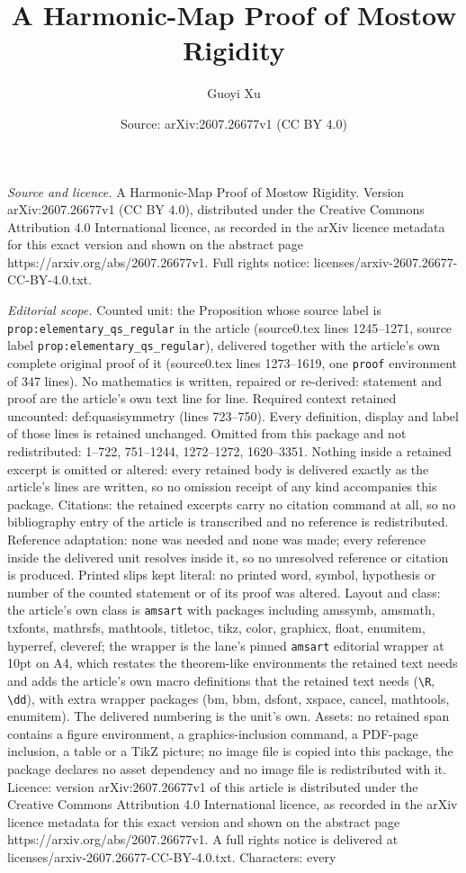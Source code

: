 \documentclass[10pt,a4paper]{amsart}
\title[A Harmonic-Map Proof of Mostow Rigidity]{A Harmonic-Map Proof of Mostow Rigidity}
\author{Guoyi Xu}
\date{Source: arXiv:2607.26677v1 (CC BY 4.0)}
\begin{document}
\maketitle

\noindent\emph{Source and licence.} A Harmonic-Map Proof of Mostow Rigidity. Version arXiv:2607.26677v1 (CC BY 4.0), distributed under the Creative Commons Attribution 4.0 International licence, as recorded in the arXiv licence metadata for this exact version and shown on the abstract page https://arxiv.org/abs/2607.26677v1. Full rights notice: licenses/arxiv-2607.26677-CC-BY-4.0.txt.\par\smallskip

\noindent\textit{Editorial scope.} Counted unit: the Proposition whose source label is \texttt{prop:elementary\_qs\_regular} in the article (source0.tex lines 1245--1271, source label \texttt{prop:elementary\_qs\_regular}), delivered together with the article's own complete original proof of it (source0.tex lines 1273--1619, one \texttt{proof} environment of 347 lines). No mathematics is written, repaired or re-derived: statement and proof are the article's own text line for line. Required context retained uncounted: def:quasisymmetry (lines 723--750). Every definition, display and label of those lines is retained unchanged. Omitted from this package and not redistributed: 1--722, 751--1244, 1272--1272, 1620--3351. Nothing inside a retained excerpt is omitted or altered: every retained body is delivered exactly as the article's lines are written, so no omission receipt of any kind accompanies this package. Citations: the retained excerpts carry no citation command at all, so no bibliography entry of the article is transcribed and no reference is redistributed. Reference adaptation: none was needed and none was made; every reference inside the delivered unit resolves inside it, so no unresolved reference or citation is produced. Printed slips kept literal: no printed word, symbol, hypothesis or number of the counted statement or of its proof was altered. Layout and class: the article's own class is \texttt{amsart} with packages including amssymb, amsmath, txfonts, mathrsfs, mathtools, titletoc, tikz, color, graphicx, float, enumitem, hyperref, cleveref; the wrapper is the lane's pinned \texttt{amsart} editorial wrapper at 10pt on A4, which restates the theorem-like environments the retained text needs and adds the article's own macro definitions that the retained text needs (\texttt{\textbackslash R}, \texttt{\textbackslash dd}), with extra wrapper packages (bm, bbm, dsfont, xspace, cancel, mathtools, enumitem). The delivered numbering is the unit's own. Assets: no retained span contains a figure environment, a graphics-inclusion command, a PDF-page inclusion, a table or a TikZ picture; no image file is copied into this package, the package declares no asset dependency and no image file is redistributed with it. Licence: version arXiv:2607.26677v1 of this article is distributed under the Creative Commons Attribution 4.0 International licence, as recorded in the arXiv licence metadata for this exact version and shown on the abstract page https://arxiv.org/abs/2607.26677v1. A full rights notice is delivered at licenses/arxiv-2607.26677-CC-BY-4.0.txt. Characters: every 
\end{document}
